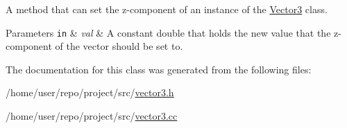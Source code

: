 A method that can set the z-\/component of an instance of the \hyperlink{classVector3}{Vector3} class. 


\begin{DoxyParams}[1]{Parameters}
\mbox{\tt in}  & {\em val} & A constant double that holds the new value that the z-\/component of the vector should be set to. \\
\hline
\end{DoxyParams}


The documentation for this class was generated from the following files\+:\begin{DoxyCompactItemize}
\item 
/home/user/repo/project/src/\hyperlink{vector3_8h}{vector3.\+h}\item 
/home/user/repo/project/src/\hyperlink{vector3_8cc}{vector3.\+cc}\end{DoxyCompactItemize}
